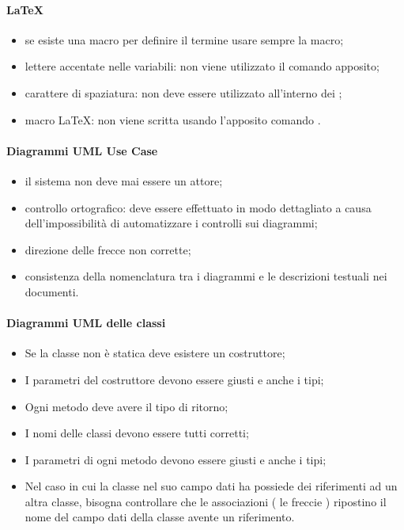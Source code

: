 \documentclass[12pt,a4paper]{article}
\begin{document}
\paragraph{LaTeX}
\begin{itemize}
	\item se esiste una macro per definire il termine usare sempre la macro;
	\item lettere accentate nelle variabili: non viene utilizzato il comando apposito; 
	\item carattere di spaziatura: non deve essere utilizzato all'interno dei ; 
	\item macro \LaTeX{}: non viene scritta usando l’apposito comando . 
\end{itemize}


\paragraph{Diagrammi UML Use Case}\label{listaUseCase}
\begin{itemize}
	\item il sistema non deve mai essere un attore; 
	\item controllo ortografico: deve essere effettuato in modo dettagliato a causa dell'impossibilità di automatizzare i controlli sui diagrammi; 
	\item direzione delle frecce non corrette; 
	\item consistenza della nomenclatura tra i diagrammi e le descrizioni testuali nei documenti. 
\end{itemize}

\paragraph{Diagrammi UML delle classi}\label{listaClassi}
\begin{itemize}
	\item Se la classe non è statica deve esistere un costruttore; 
	\item I parametri del costruttore devono essere giusti e anche i tipi; 
	\item Ogni metodo deve avere il tipo di ritorno;
	\item I nomi delle classi devono essere tutti corretti;
	\item I parametri di ogni metodo devono essere giusti e anche i tipi;
	\item Nel caso in cui la classe nel suo campo dati ha possiede dei riferimenti ad un altra classe, bisogna controllare che le associazioni ( le freccie ) ripostino il nome del campo dati della classe avente un riferimento.
\end{itemize}
\end{document}
